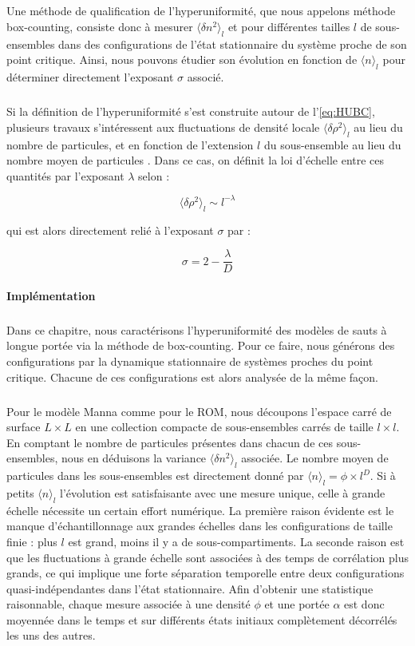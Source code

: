 \subparagraph{}Une méthode de qualification de l'hyperuniformité, que nous appelons méthode box-counting, consiste donc à mesurer $\langle \delta n^2\rangle_l$ et pour différentes tailles $l$ de sous-ensembles dans des configurations de l'état stationnaire du système proche de son point critique. Ainsi, nous pouvons étudier son évolution en fonction de $\langle n \rangle_l$ pour déterminer directement l'exposant $\sigma$ associé.

\subparagraph{}Si la définition de l'hyperuniformité s'est construite autour de l'\autoref{eq:HUBC}, plusieurs travaux s'intéressent aux fluctuations de densité locale $\langle \delta \rho^2\rangle_l$ au lieu du nombre de particules, et en fonction de l'extension $l$ du sous-ensemble au lieu du nombre moyen de particules \cite{hexner_hyperuniformity_2015, bub_lee_hyperuniformity_2019}. Dans ce cas, on définit la loi d'échelle entre ces quantités par l'exposant $\lambda$ selon :

\begin{equation}
	\langle \delta \rho^2\rangle_l \sim l^{-\lambda}
\end{equation}

\noindent qui est alors directement relié à l'exposant $\sigma$ par :

\begin{equation}
	\sigma = 2 - \frac{\lambda}{D}
\end{equation}

\paragraph{Implémentation}

\subparagraph{}Dans ce chapitre, nous caractérisons l'hyperuniformité des modèles de sauts à longue portée via la méthode de box-counting. Pour ce faire, nous générons des configurations par la dynamique stationnaire de systèmes proches du point critique. Chacune de ces configurations est alors analysée de la même façon.

\subparagraph{}Pour le modèle Manna comme pour le ROM, nous découpons l'espace carré de surface $L\times L$ en une collection compacte de sous-ensembles carrés de taille $l\times l$. En comptant le nombre de particules présentes dans chacun de ces sous-ensembles, nous en déduisons la variance $\langle \delta n^2\rangle_l$ associée. Le nombre moyen de particules dans les sous-ensembles est directement donné par  $\langle n \rangle_l= \phi \times l^D$. Si à petits $\langle n \rangle_l$ l'évolution est satisfaisante avec une mesure unique, celle à grande échelle nécessite un certain effort numérique. La première raison évidente est le manque d'échantillonnage aux grandes échelles dans les configurations de taille finie : plus $l$ est grand, moins il y a de sous-compartiments. La seconde raison est que les fluctuations à grande échelle sont associées à des temps de corrélation plus grands, ce qui implique une forte séparation temporelle entre deux configurations quasi-indépendantes dans l'état stationnaire. Afin d'obtenir une statistique raisonnable, chaque mesure associée à une densité $\phi$ et une portée $\alpha$ est donc moyennée dans le temps et sur différents états initiaux complètement décorrélés les uns des autres.

